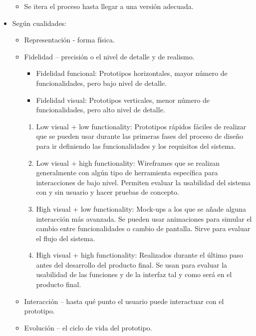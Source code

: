 \documentclass[12pt, twoside, openright]{report} %
\begin{document}
\begin{itemize}
      \begin{itemize}
      
      \item
        Se itera el proceso hasta llegar a una versión adecuada.
      \end{itemize}
	  \pagebreak
    \item
      Según cualidades:

      \begin{itemize}
      
      \item
        Representación - forma física.
      \item
        Fidelidad -- precisión o el nivel de detalle y de realismo.

        \begin{itemize}
        
        \item
          Fidelidad funcional: Prototipos horizontales, mayor número de
          funcionalidades, pero bajo nivel de detalle.
        \item
          Fidelidad visual: Prototipos verticales, menor número de
          funcionalidades, pero alto nivel de detalle.
        \end{itemize}

        \begin{enumerate}
        \def\labelenumi{\arabic{enumi}.}
        
        \item
          Low visual + low functionality: Prototipos rápidos fáciles de
          realizar que se pueden usar durante las primeras fases del
          proceso de diseño para ir definiendo las funcionalidades y los
          requisitos del sistema.
        \item
          Low visual + high functionality: Wireframes que se realizan
          generalmente con algún tipo de herramienta específica para
          interacciones de bajo nivel. Permiten evaluar la usabilidad
          del sistema con y sin usuario y hacer pruebas de concepto.
        \item
          High visual + low functionality: Mock-ups a los que se añade
          alguna interacción más avanzada. Se pueden usar animaciones
          para simular el cambio entre funcionalidades o cambio de
          pantalla. Sirve para evaluar el flujo del sistema.
        \item
          High visual + high functionality: Realizados durante el último
          paso antes del desarrollo del producto final. Se usan para
          evaluar la usabilidad de las funciones y de la interfaz tal y
          como será en el producto final.
        \end{enumerate}
      \item
        Interacción -- hasta qué punto el usuario puede interactuar con
        el prototipo.
      \item
        Evolución -- el ciclo de vida del prototipo.
      \end{itemize}
    \end{itemize}
\end{document}
